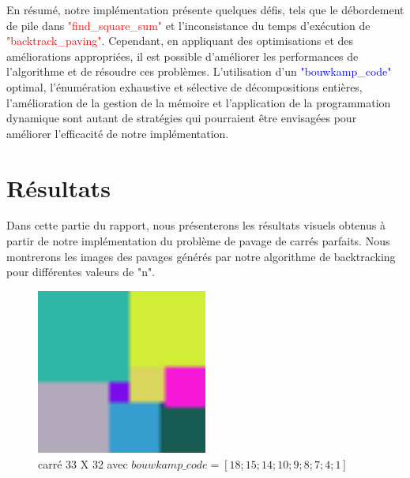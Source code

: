 \documentclass{article}
\begin{document}
En résumé, notre implémentation présente quelques défis, tels que le débordement de pile dans \textcolor{red}{"find\_square\_sum"} et l'inconsistance du temps d'exécution de \textcolor{red}{"backtrack\_paving"}. Cependant, en appliquant des optimisations et des améliorations appropriées, il est possible d'améliorer les performances de l'algorithme et de résoudre ces problèmes. L'utilisation d'un \textcolor{blue}{"bouwkamp\_code"} optimal, l'énumération exhaustive et sélective de décompositions entières, l'amélioration de la gestion de la mémoire et l'application de la programmation dynamique sont autant de stratégies qui pourraient être envisagées pour améliorer l'efficacité de notre implémentation.





\section{Résultats }

Dans cette partie du rapport, nous présenterons les résultats visuels obtenus à partir de notre implémentation du problème de pavage de carrés parfaits. Nous montrerons les images des pavages générés par notre algorithme de backtracking pour différentes valeurs de "n".

\begin{figure}[htbp]
  \centering
  
  \includegraphics[width=0.5\textwidth]{image/32-33.png}
  \caption{carré 33 X 32 avec $bouwkamp\_code = [18;15;14;10;9;8;7;4;1]$}
  \label{fig6}

\end{figure}
\end{document}
